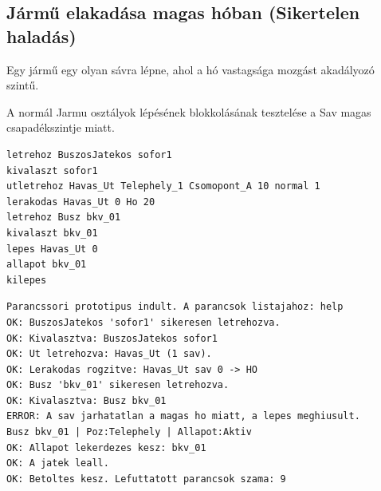 \subsection{Jármű elakadása magas hóban (Sikertelen haladás)}
\begin{test-case-description}
    Egy jármű egy olyan sávra lépne, ahol a hó vastagsága mozgást akadályozó szintű.
\end{test-case-description}
\begin{test-case-function}
    A normál Jarmu osztályok lépésének blokkolásának tesztelése a Sav magas csapadékszintje miatt.
\end{test-case-function}
\begin{test-case-input}
\begin{verbatim}
letrehoz BuszosJatekos sofor1
kivalaszt sofor1
utletrehoz Havas_Ut Telephely_1 Csomopont_A 10 normal 1
lerakodas Havas_Ut 0 Ho 20
letrehoz Busz bkv_01
kivalaszt bkv_01
lepes Havas_Ut 0
allapot bkv_01
kilepes
\end{verbatim}
\end{test-case-input}
\begin{test-case-output}
\begin{verbatim}
Parancssori prototipus indult. A parancsok listajahoz: help
OK: BuszosJatekos 'sofor1' sikeresen letrehozva.
OK: Kivalasztva: BuszosJatekos sofor1
OK: Ut letrehozva: Havas_Ut (1 sav).
OK: Lerakodas rogzitve: Havas_Ut sav 0 -> HO
OK: Busz 'bkv_01' sikeresen letrehozva.
OK: Kivalasztva: Busz bkv_01
ERROR: A sav jarhatatlan a magas ho miatt, a lepes meghiusult.
Busz bkv_01 | Poz:Telephely | Allapot:Aktiv
OK: Allapot lekerdezes kesz: bkv_01
OK: A jatek leall.
OK: Betoltes kesz. Lefuttatott parancsok szama: 9
\end{verbatim}
\end{test-case-output}

